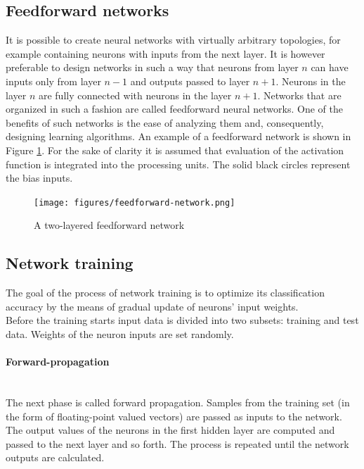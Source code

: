 \documentclass[11pt,oneside, a4paper]{report}
\begin{document}
\subsection{Feedforward networks}
It is possible to create neural networks with virtually arbitrary topologies, for example containing neurons with inputs from the next layer. It is however preferable to design networks in such a way that neurons from layer $n$ can have inputs only from layer $n-1$ and outputs passed to layer $n+1$. Neurons in the layer $n$ are fully connected with neurons in the layer $n+1$. Networks that are organized in such a fashion are called feedforward neural networks. One of the benefits of such networks is the ease of analyzing them and, consequently, designing learning algorithms. 
An example of a feedforward network is shown in Figure \ref{fig:feedforward-network}. For the sake of clarity it is assumed that evaluation of the activation function is integrated into the processing units. The solid black circles represent the bias inputs.
\begin{figure}[htp]
\centering
\texttt{[image: figures/feedforward-network.png]}
\caption{A two-layered feedforward network}
\label{fig:feedforward-network}
\end{figure}

\subsection{Network training}\label{ssec:network-training}
The goal of the process of network training is to optimize its classification accuracy by the means of gradual update of neurons' input weights.
\\
Before the training starts input data is divided into two subsets: training and test data. Weights of the neuron inputs are set randomly.
\\
\paragraph{Forward-propagation}\mbox{}\\
The next phase is called forward propagation. Samples from the training set (in the form of floating-point valued vectors) are passed as inputs to the network. The output values of the neurons in the first hidden layer are computed and passed to the next layer and so forth. The process is repeated until the network outputs are calculated.
\end{document}
